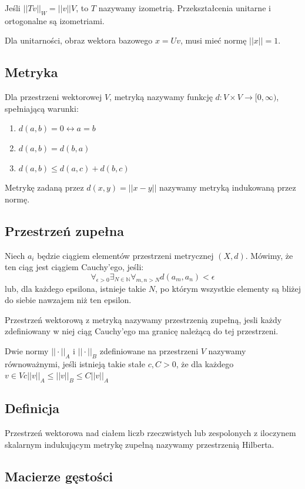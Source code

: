 \documentclass{../notatki}
\begin{document}
Jeśli $||Tv||_W = ||v||V$, to $T$ nazywamy izometrią. Przekształcenia unitarne
i ortogonalne są izometriami.

Dla unitarności, obraz wektora bazowego $x = Uv$, musi mieć normę $||x|| = 1$.

\subsection{Metryka}

Dla przestrzeni wektorowej $V$, metryką nazywamy funkcję $d: V \times
V \to [0, \infty)$, spełniającą warunki:
\begin{enumerate}
  \item $d(a, b) = 0 \leftrightarrow a = b$
  \item $d(a, b) = d(b, a)$
  \item $d(a, b) \leq d(a, c) + d(b, c)$
\end{enumerate}

Metrykę zadaną przez $d(x, y) = ||x - y||$ nazywamy metryką
indukowaną przez normę.

\subsection{Przestrzeń zupełna}

Niech $a_i$ będzie ciągiem elementów przestrzeni metrycznej $(X, d)$. Mówimy, że
ten ciąg jest ciągiem Cauchy'ego, jeśli:
$$
\forall_{\epsilon > 0} \exists_{N \in \mathbb{N}} \forall_{m, n > N}
d(a_m, a_n) < \epsilon
$$
lub, dla każdego epsilona, istnieje takie $N$, po którym wszystkie elementy
są bliżej do siebie nawzajem niż ten epsilon.

Przestrzeń wektorową z metryką nazywamy przestrzenią zupełną, jesli każdy
zdefiniowany w niej ciąg Cauchy'ego ma granicę należącą do tej przestrzeni.

Dwie normy $||\cdot||_A$ i $||\cdot||_B$ zdefiniowane na przestrzeni $V$
nazywamy równoważnymi, jeśli istnieją takie stałe $c, C > 0$, że dla każdego
$v \in V c||v||_A \leq ||v||_B \leq C||v||_A$

\subsection{Definicja}

Przestrzeń wektorowa nad ciałem liczb rzeczwistych lub zespolonych z iloczynem
skalarnym indukującym metrykę zupełną nazywamy przestrzenią Hilberta.

\subsection{Macierze gęstości}
\end{document}
